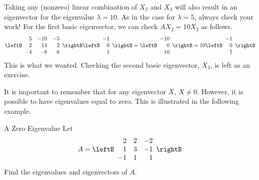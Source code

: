 \begin{solution}
Taking any (nonzero) linear combination of $X_2$ and $X_3$ will also result in an eigenvector for
the eigenvalue $\lambda =10.$ As in the case for $\lambda =5$, always check your work! 
For the first basic eigenvector,  we can check $AX_2 = 10 X_2$ as follows. 
\begin{equation*}
\leftB 
\begin{array}{rrr}
5 & -10 & -5 \\
2 & 14 & 2 \\
-4 & -8 & 6
\end{array}
\rightB \leftB
\begin{array}{r}
-1 \\
0 \\
1
\end{array}
\rightB = \leftB
\begin{array}{r}
-10 \\
0 \\
10
\end{array}
\rightB =10\leftB
\begin{array}{r}
-1 \\
0 \\
1
\end{array}
\rightB
\end{equation*}
This is what we wanted. Checking the second basic eigenvector, $X_3$, is left as an exercise. 
\end{solution}

It is important to remember that for any eigenvector $X$, $X \neq 0$. However, it is possible 
to have eigenvalues equal to zero. This is illustrated in the following example. 

\begin{example}{A Zero Eigenvalue}\label{exa:zeroeigenvalue}
Let
\begin{equation*}
A=\leftB
\begin{array}{rrr}
2 & 2 & -2 \\
1 & 3 & -1 \\
-1 & 1 & 1
\end{array}
\rightB
\end{equation*}
Find the eigenvalues and eigenvectors of $A$.
\end{example}

